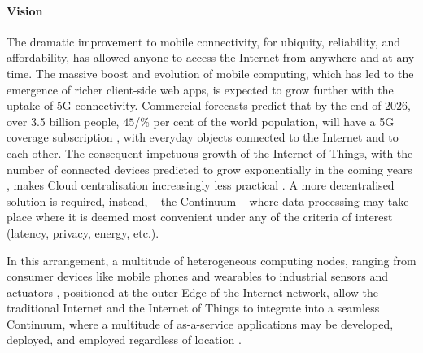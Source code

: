 \paragraph{Vision}
The dramatic improvement to mobile connectivity, for ubiquity, reliability, and affordability, has allowed anyone to access the Internet from anywhere and at any time.
The massive boost and evolution of mobile computing, which has led to the emergence of richer client-side web apps, is expected to grow further with the uptake of 5G connectivity. 
Commercial forecasts predict that by the end of 2026,  over 3.5 billion people, $45$/\% per cent of the world population, will have a 5G coverage subscription \cite{ericsson-5g}, with everyday objects connected to the Internet and to each other. 
The consequent impetuous growth of the Internet of Things, with the number of connected devices predicted to grow exponentially in the coming years \cite{gartner-iot}, makes Cloud centralisation increasingly less practical \cite{mell2011nist}.
A more decentralised solution is required, instead, -- the Continuum -- where data processing may take place where it is deemed most convenient under any of the criteria of interest (latency, privacy, energy, etc.).

In this arrangement, a multitude of heterogeneous computing nodes, ranging from consumer devices like mobile phones and wearables to industrial sensors and actuators \cite{chen2018edge}, positioned at the outer Edge of the Internet network, allow the traditional Internet and the Internet of Things to integrate into a seamless Continuum, where a multitude of as-a-service applications may be developed, deployed, and employed regardless of location \cite{beckman2020harnessing}.

